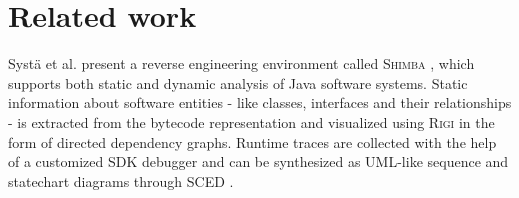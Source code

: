\chapter{Related work}
\thispagestyle{fancy}
\label{c:relatedwork}

Systä et al. present a reverse engineering environment called \textsc{Shimba} \cite{systa2001shimba}, which supports both static and dynamic analysis of Java software systems.
Static information about software entities - like classes, interfaces and their relationships - is extracted from the bytecode representation and visualized using \textsc{Rigi} \cite{Muller:1993:USS:962289.962309} in the form of directed dependency graphs.
Runtime traces are collected with the help of a customized SDK debugger and can be synthesized as UML-like sequence and statechart diagrams through \textsc{SCED} \cite{Koskimies:1998:ASM:624623.625817,891472}.
